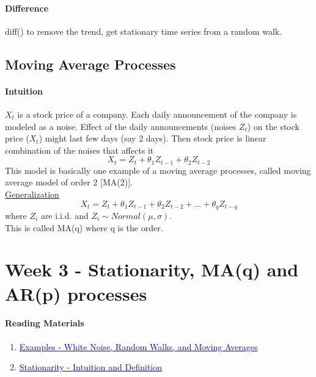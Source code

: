 \documentclass[11pt]{article}
\newcommand{\under}[1]{\underline{#1}}
\begin{document}
\paragraph{Difference}
diff() to remove the trend, get stationary time series from a random walk.

\subsection{Moving Average Processes}
\paragraph{Intuition}
$X_t$ is a stock price of a company. Each daily announcement of the company is modeled as a noise. Effect of the daily announcements (noises $Z_t$) on the stock price ($X_t$) might last few days (say 2 days). Then stock price is linear combination of the noises that affects it 
$$X_t = Z_t + \theta_1 Z_{t-1} + \theta_2 Z_{t-2}$$
This model is basically one example of a moving average processes, called moving average model of order 2 [MA(2)]. \\
\under{Generalization}\\
$$X_t = Z_t + \theta_1 Z_{t-1} + \theta_2 Z_{t-2} + \hdots + \theta_q Z_{t-q}$$
where $Z_i$ are i.i.d. and $Z_i \sim Normal(\mu, \sigma)$.\\
This is called MA(q) where q is the order.

\section{Week 3 - Stationarity, MA(q) and AR(p) processes}
\paragraph{Reading Materials}
\begin{enumerate}
	\item \href{https://d3c33hcgiwev3.cloudfront.net/_374ac75bfb1940158d7e4052f7c03d09_Stationarity---Examples--White-Noise_-Random-Walks_-and-Moving-Averages.pdf?Expires=1563148800&Signature=GvM6uPGci~v8-wjeys0ytXyCTHLrtumwzggd1EEk41mHi4-s-yXXRZAoxeZN2QWpDlnwPtrMKgdpfb6TrEKnxr9rIoBAzPOrwd~jiBhmYk9QTkqHetsCg1l1BsG5SF6W6xC72aTnB1ZT2q9hSgzAjgoxOGkdTgGEvKpmeF40J~M_&Key-Pair-Id=APKAJLTNE6QMUY6HBC5A}{\textcolor{blue}{Examples - White Noise, Random Walks, and Moving Averages}}
	\item \href{https://d18ky98rnyall9.cloudfront.net/_9ea06758bd41cded9788592bdac148a3_Stationarity---Intuition-and-Definition.pdf?Expires=1563148800&Signature=Fr-OZqXfqynm8fQDFG24EXJfFkGALRz3EOpuvJ9AdCqKIsf96CSegIp9YOqF1~nRdFAuhmgFcmk9zBi7Yis~e9n-gt1HI8LV0vb3CaKw05oDVl3Oc47yu2vc5~B3Dl-4WqquAH7gkYKJSWPHuG4RdvmBU-ZbSDTNGtz5hfneonE_&Key-Pair-Id=APKAJLTNE6QMUY6HBC5A}{\textcolor{blue}{Stationarity - Intuition and Definition}}
\end{enumerate}
\end{document}
